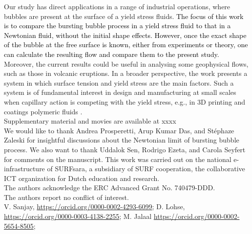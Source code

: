 \documentclass[final]{jfm}
\newcommand*\red{\textcolor{black}}
\begin{document}
Our study has direct applications in a range of industrial operations, where bubbles are present at the surface of a yield stress fluids. \red{The focus of this work is to compare the bursting bubble process in a yield stress fluid to that in a Newtonian fluid, without the initial shape effects. However, once the exact shape of the bubble at the free surface is known, either from experiments or theory, one can calculate the resulting flow and compare them to the present study.} Moreover, the current results could be useful in analysing some geophysical flows, such as those in volcanic eruptions. In a broader perspective, the work presents a system in which surface tension and yield stress are the main factors. Such a system is of fundamental interest in design and manufacturing at small scales when capillary action is competing with the yield stress, e.g., in 3D printing and coatings polymeric fluids \citep{rauzan2018particle, nelson2019designing, jalaal2019laser, jalaal2021spreading}.\\



 \label{SupMat} Supplementary material and movies are available at xxxx \\

 We would like to thank Andrea Prosperetti, Arup Kumar Das, and Stéphaze Zaleski for insightful discussions about the Newtonian limit of bursting bubble process. We also want to thank Uddalok Sen, Rodrigo Ezeta, and Carola Seyfert for comments on the manuscript. This work was carried out on the national e-infrastructure of SURFsara, a subsidiary of SURF cooperation, the collaborative ICT organization for Dutch education and research.\\

 The authors acknowledge the ERC Advanced Grant No. 740479-DDD.\\

 The  authors report no conflict of interest. \\

 V. Sanjay, \href{https://orcid.org/0000-0002-4293-6099}{https://orcid.org/0000-0002-4293-6099}; D. Lohse, \href{https://orcid.org/0000-0003-4138-2255}{https://orcid.org/0000-0003-4138-2255}; M. Jalaal \href{https://orcid.org/0000-0002-5654-8505}{https://orcid.org/0000-0002-5654-8505};\\
\end{document}
